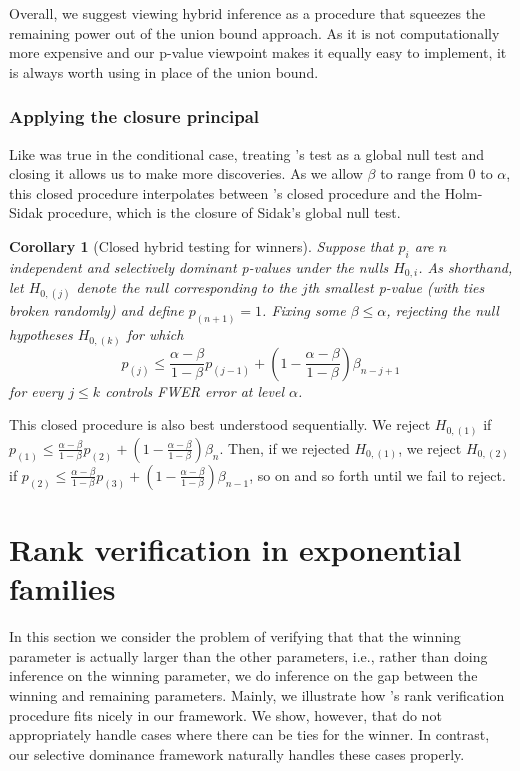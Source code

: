 \documentclass{article}
\newtheorem{corollary}{Corollary}
\begin{document}
Overall, we suggest viewing hybrid inference as a procedure that squeezes the remaining power out of the union bound approach. As it is not computationally more expensive and our p-value viewpoint makes it equally easy to implement, it is always worth using in place of the union bound. 

\subsubsection{Applying the closure principal}

Like was true in the conditional case, treating 's test as a global null test and closing it allows us to make more discoveries. As we allow $\beta$ to range from $0$ to $\alpha$, this closed procedure interpolates between 's closed procedure and the Holm-Sidak procedure, which is the closure of Sidak's global null test. 

\begin{corollary}[Closed hybrid testing for winners]
    \label{cor:hyb_closed}
    Suppose that $p_i$ are $n$ independent and selectively dominant p-values under the nulls $H_{0, i}$. As shorthand, let $H_{0, (j)}$ denote the null corresponding to the $j$th smallest p-value (with ties broken randomly) and define $p_{(n+1)} = 1$. Fixing some $\beta \leq \alpha$, rejecting the null hypotheses $H_{0, (k)}$ for which
    \begin{equation*}
        p_{(j)} \leq \frac{\alpha - \beta}{1-\beta} p_{(j-1)} + \left(1 - \frac{\alpha - \beta}{1-\beta} \right) \beta_{n - j + 1}   
    \end{equation*}
    for every $j \leq k$ controls FWER error at level $\alpha$. 
\end{corollary}

This closed procedure is also best understood sequentially. We reject $H_{0, (1)}$ if $p_{(1)} \leq \frac{\alpha - \beta}{1-\beta} p_{(2)} + (1 - \frac{\alpha - \beta}{1-\beta}) \beta_n$. Then, if we rejected $H_{0, (1)}$, we reject $H_{0, (2)}$ if $p_{(2)} \leq  \frac{\alpha - \beta}{1-\beta} p_{(3)} + (1 - \frac{\alpha -\beta }{1-\beta}) \beta_{n-1}$, so on and so forth until we fail to reject. 


\section{Rank verification in exponential families}
\label{sec:rank_verification}

In this section we consider the problem of verifying that that the winning parameter is actually larger than the other parameters, i.e., rather than doing inference on the winning parameter, we do inference on the gap between the winning and remaining parameters. Mainly, we illustrate how \cite{Hung2019}'s rank verification procedure fits nicely in our framework. We show, however, that \cite{Hung2019} do not appropriately handle cases where there can be ties for the winner. In contrast, our selective dominance framework naturally handles these cases properly.
\end{document}
